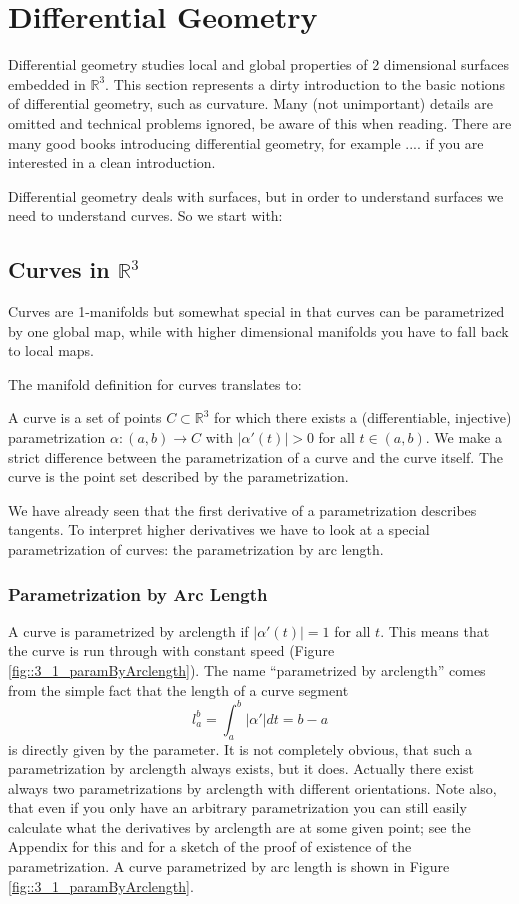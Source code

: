 \section{Differential Geometry}
Differential geometry studies local and global properties of 2 dimensional surfaces embedded in $\mathbb R^3$. This section represents a dirty introduction to the basic notions of differential geometry, such as curvature. Many (not unimportant) details are omitted and technical problems ignored, be aware of this when reading. There are many good books introducing differential geometry, for example .... if you are interested in a clean introduction.

Differential geometry deals with surfaces, but in order to understand surfaces we need to understand curves. So we start with:

\subsection{Curves in $\mathbb R^3$}
Curves are 1-manifolds but somewhat special in that curves can be parametrized by one global map, while with higher dimensional manifolds you have to fall back to local maps. 

The manifold definition for curves translates to: 

\begin{definition}[Curve] A curve is a set of points $C \subset \mathbb R^3$ for which there exists a (differentiable, injective) parametrization $\alpha : (a,b) \to C$ with $\left|\alpha'(t)\right| >0$ for all $t\in (a,b)$. We make a strict difference between the parametrization of a curve and the curve itself. The curve is the point set described by the parametrization.
\end{definition}


We have already seen that the first derivative of a parametrization describes tangents. To interpret higher derivatives we have to look at a special parametrization of curves: the parametrization by arc length.

\subsubsection{Parametrization by Arc Length}

A curve is parametrized by arclength if $|\alpha'(t)|=1$ for all $t$. This means that the curve is run through with constant speed (Figure \ref{fig::3_1_paramByArclength}). The name ``parametrized by arclength'' comes from the simple fact that the length of a curve segment 
\[l_a^b = \int_a^b |\alpha'| dt = b-a\]
is directly given by the parameter. It is not completely obvious, that such a parametrization by arclength always exists, but it does. Actually there exist always two parametrizations by arclength with different orientations. Note also, that even if you only have an arbitrary parametrization you can still easily calculate what the derivatives by arclength are at some given point; see the Appendix for this and for a sketch of the proof of existence of the parametrization. A curve parametrized by arc length is shown in Figure \ref{fig::3_1_paramByArclength}.


